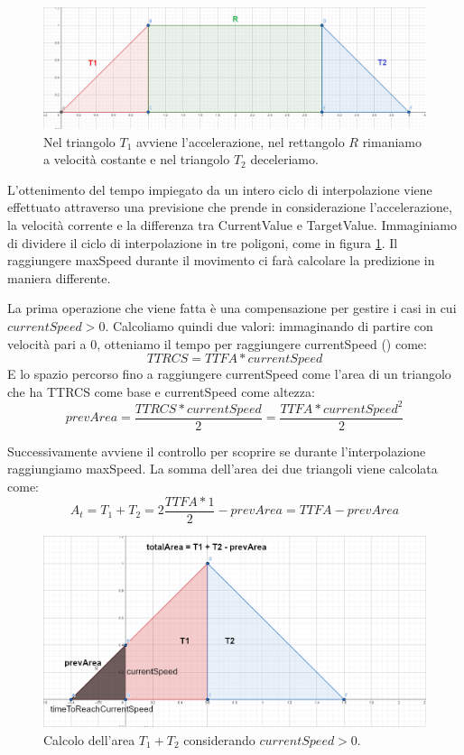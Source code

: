 \documentclass[main.tex]{subfiles}
\begin{document}
\begin{figure}
    \centering
    \captionsetup{justification=centering}
    \includegraphics[scale=0.25]{img/interpolazione/movementThreeParts.png}
    \caption{Nel triangolo $T_1$ avviene l'accelerazione, nel rettangolo $R$ rimaniamo a velocità costante e nel triangolo $T_2$ deceleriamo.}
    \label{fig:4_movementThreeParts}
\end{figure}
\noindent L'ottenimento del tempo impiegato da un intero ciclo di interpolazione viene effettuato attraverso una previsione che prende in considerazione l'accelerazione, la velocità corrente e la differenza tra CurrentValue e TargetValue. Immaginiamo di dividere il ciclo di interpolazione in tre poligoni, come in figura \ref{fig:4_movementThreeParts}. Il raggiungere maxSpeed durante il movimento ci farà calcolare la predizione in maniera differente. \newline

La prima operazione che viene fatta è una compensazione per gestire i casi in cui $currentSpeed > 0$. Calcoliamo quindi due valori: immaginando di partire con velocità pari a 0, otteniamo il tempo per raggiungere currentSpeed () come:
\[TTRCS = TTFA * currentSpeed\]
E lo spazio percorso fino a raggiungere currentSpeed come l'area di un triangolo che ha TTRCS come base e currentSpeed come altezza:
\[prevArea = \frac{TTRCS * currentSpeed}{2} = \frac{TTFA * currentSpeed^2}{2}\]

Successivamente avviene il controllo per scoprire se durante l'interpolazione raggiungiamo maxSpeed. La somma dell'area dei due triangoli viene calcolata come:
\[A_t = T_1 + T_2 = 2\frac{TTFA * 1}{2} - prevArea = TTFA - prevArea\]
\begin{figure}[H]
    \centering
    \includegraphics[width=.9\linewidth]{img/interpolazione/speedCapTriangleAreaSplice.png}
    \caption{Calcolo dell'area $T_1 + T_2$ considerando $currentSpeed > 0$.}
    \label{fig:4_speedCapTriangleAreaSplice}
\end{figure}
\end{document}
